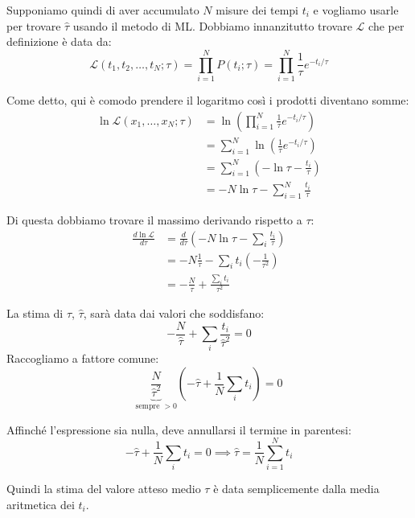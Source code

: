 \documentclass[openany,a4paper,12pt]{book}
\providecommand{\mathscr}[1]{\mathcal{#1}}
\theoremstyle{remark}
\begin{document}
Supponiamo quindi di aver accumulato $N$ misure dei tempi $t_i$ e vogliamo usarle per trovare $\hat{\tau}$ usando il metodo di ML.
Dobbiamo innanzitutto trovare $\mathscr{L}$ che per definizione è data da:
\begin{equation}
\mathscr{L}(t_1, t_2, \dots, t_N ; \tau) = \prod_{i=1}^N P(t_i ; \tau) = \prod_{i=1}^N \frac{1}{\tau} e^{-t_i/\tau}
\end{equation}

Come detto, qui è comodo prendere il logaritmo così i prodotti diventano somme:
\begin{align*}
\ln \mathscr{L}(x_1, \dots, x_N ; \tau) &= \ln \left( \prod_{i=1}^N \frac{1}{\tau} e^{-t_i/\tau} \right) \\
&= \sum_{i=1}^N \ln \left( \frac{1}{\tau} e^{-t_i/\tau} \right) \\
&= \sum_{i=1}^N \left( -\ln \tau - \frac{t_i}{\tau} \right) \\
&= -N \ln \tau - \sum_{i=1}^N \frac{t_i}{\tau}
\end{align*}

Di questa dobbiamo trovare il massimo derivando rispetto a $\tau$:
\begin{align*}
\frac{d\ln \mathscr{L}}{d\tau} &= \frac{d}{d\tau} \left( -N \ln \tau - \sum_i \frac{t_i}{\tau} \right) \\
&= -N \frac{1}{\tau} - \sum_i t_i \left( -\frac{1}{\tau^2} \right) \\
&= -\frac{N}{\tau} + \frac{\sum_i t_i}{\tau^2}
\end{align*}

La stima di $\tau$, $\hat{\tau}$, sarà data dai valori che soddisfano:
\begin{equation}
-\frac{N}{\hat{\tau}} + \sum_i \frac{t_i}{\hat{\tau}^2} = 0
\end{equation}
Raccogliamo a fattore comune:
\begin{equation}
\underbrace{\frac{N}{\hat{\tau}^2}}_{\text{sempre } > 0} \left( -\hat{\tau} + \frac{1}{N} \sum_i t_i \right) = 0
\end{equation}

Affinché l'espressione sia nulla, deve annullarsi il termine in parentesi:
\begin{equation}
-\hat{\tau} + \frac{1}{N} \sum_i t_i = 0 \implies \hat{\tau} = \frac{1}{N} \sum_{i=1}^N t_i
\end{equation}

Quindi la stima del valore atteso medio $\tau$ è data semplicemente dalla media aritmetica dei $t_i$.
\end{document}
